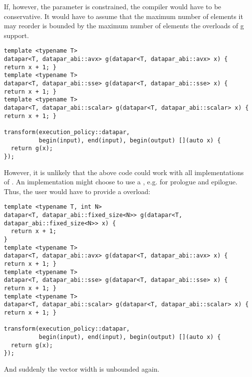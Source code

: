 If, however, the  parameter is constrained, the compiler would have to be conservative.
It would have to assume that the maximum number of elements it may reorder is bounded by the maximum number of elements the overloads of \code g support.
\smallskip\begin{lstlisting}[style=Vc]
template <typename T>
datapar<T, datapar_abi::avx> g(datapar<T, datapar_abi::avx> x) { return x + 1; }
template <typename T>
datapar<T, datapar_abi::sse> g(datapar<T, datapar_abi::sse> x) { return x + 1; }
template <typename T>
datapar<T, datapar_abi::scalar> g(datapar<T, datapar_abi::scalar> x) { return x + 1; }

transform(execution_policy::datapar,
          begin(input), end(input), begin(output) [](auto x) {
  return g(x);
});
\end{lstlisting}
However, it is unlikely that the above code could work with all implementations of .
An implementation might choose to use a , e.g. for prologue and epilogue.
Thus, the user would have to provide a  overload:
\smallskip\begin{lstlisting}[style=Vc]
template <typename T, int N>
datapar<T, datapar_abi::fixed_size<N>> g(datapar<T, datapar_abi::fixed_size<N>> x) {
  return x + 1;
}
template <typename T>
datapar<T, datapar_abi::avx> g(datapar<T, datapar_abi::avx> x) { return x + 1; }
template <typename T>
datapar<T, datapar_abi::sse> g(datapar<T, datapar_abi::sse> x) { return x + 1; }
template <typename T>
datapar<T, datapar_abi::scalar> g(datapar<T, datapar_abi::scalar> x) { return x + 1; }

transform(execution_policy::datapar,
          begin(input), end(input), begin(output) [](auto x) {
  return g(x);
});
\end{lstlisting}
And suddenly the vector width is unbounded again.

